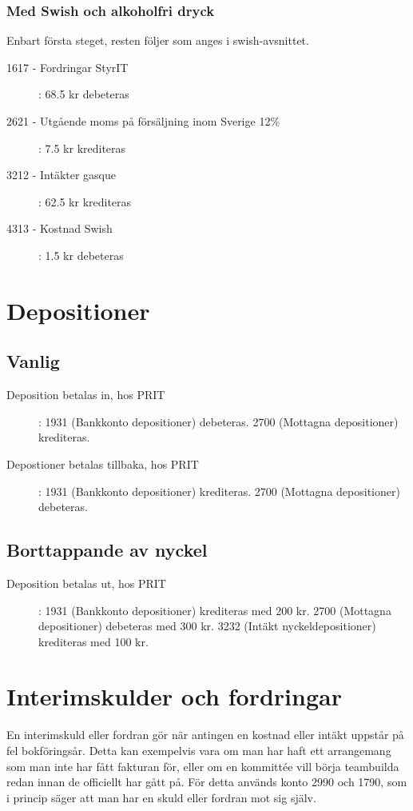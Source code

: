 \documentclass{article}
\begin{document}
\subsubsection{Med Swish och alkoholfri dryck}
Enbart första steget, resten följer som anges i swish-avsnittet. 
\begin{description}
    \item [1617 - Fordringar StyrIT ]: 68.5 kr debeteras
    \item [2621 - Utgående moms på försäljning inom Sverige 12\%]: 7.5 kr krediteras
    \item [3212 - Intäkter gasque]: 62.5 kr krediteras
    \item [4313 - Kostnad Swish]: 1.5 kr debeteras
\end{description}
\section{Depositioner}
\subsection{Vanlig}
\begin{description}
    \item [Deposition betalas in, hos PRIT]: 1931 (Bankkonto depositioner) debeteras. 2700 (Mottagna depositioner) krediteras.
    \item [Depostioner betalas tillbaka, hos PRIT]: 1931 (Bankkonto depositioner) krediteras. 2700 (Mottagna depositioner) debeteras.
\end{description}
\subsection{Borttappande av nyckel}
\begin{description}
    \item [Deposition betalas ut, hos PRIT]: 1931 (Bankkonto depositioner) krediteras med 200 kr. 2700 (Mottagna depositioner) debeteras med 300 kr. 3232 (Intäkt nyckeldepositioner) krediteras med 100 kr.
\end{description}


\section{Interimskulder och fordringar}
En interimskuld eller fordran gör när antingen en kostnad eller intäkt uppstår på fel bokföringsår. Detta kan exempelvis vara om man har haft ett arrangemang som man inte har fått fakturan för, eller om en kommittée vill börja teambuilda redan innan de officiellt har gått på. För detta används konto 2990 och 1790, som i princip säger att man har en skuld eller fordran mot sig själv. 
\end{document}
